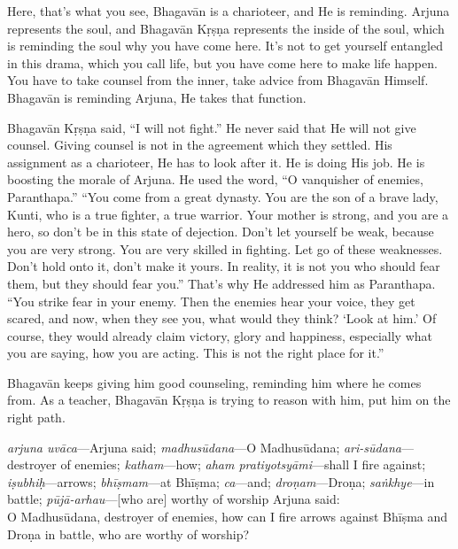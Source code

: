 Here, that’s what you see, Bhagavān is a charioteer, and He is reminding. Arjuna represents the soul, and Bhagavān Kṛṣṇa represents the inside of the soul, which is reminding the soul why you have come here. It’s not to get yourself entangled in this drama, which you call life, but you have come here to make life happen. You have to take counsel from the inner, take advice from Bhagavān Himself. Bhagavān is reminding Arjuna, He takes that function.

Bhagavān Kṛṣṇa said, “I will not fight.” He never said that He will not give counsel. Giving counsel is not in the agreement which they settled. His assignment as a charioteer, He has to look after it. He is doing His job. He is boosting the morale of Arjuna. He used the word, “O vanquisher of enemies, Paranthapa.” “You come from a great dynasty. You are the son of a brave lady, Kunti, who is a true fighter, a true warrior. Your mother is strong, and you are a hero, so don’t be in this state of dejection. Don’t let yourself be weak, because you are very strong. You are very skilled in fighting. Let go of these weaknesses. Don’t hold onto it, don’t make it yours. In reality, it is not you who should fear them, but they should fear you.” That’s why He addressed him as Paranthapa. “You strike fear in your enemy. Then the enemies hear your voice, they get scared, and now, when they see you, what would they think? ‘Look at him.’ Of course, they would already claim victory, glory and happiness, especially what you are saying, how you are acting. This is not the right place for it.”

Bhagavān keeps giving him good counseling, reminding him where he comes from. As a teacher, Bhagavān Kṛṣṇa is trying to reason with him, put him on the right path.

{%
  \textit{arjuna uvāca}---Arjuna said; 
  \textit{madhusūdana}---O Madhusūdana; 
  \textit{ari-sūdana}---destroyer of enemies; 
  \textit{katham}---how; 
  \textit{aham pratiyotsyāmi}---shall I fire against; 
  \textit{iṣubhiḥ}---arrows; 
  \textit{bhīṣmam}---at Bhīṣma; 
  \textit{ca}---and; 
  \textit{droṇam}---Droṇa; 
  \textit{saṅkhye}---in battle; 
  \textit{pūjā-arhau}---[who are] worthy of worship
}
{%
  \hspace*{1em}Arjuna said: \\
  O Madhusūdana, destroyer of enemies, how can I fire arrows against Bhīṣma and Droṇa in battle, who are worthy of worship?
}

